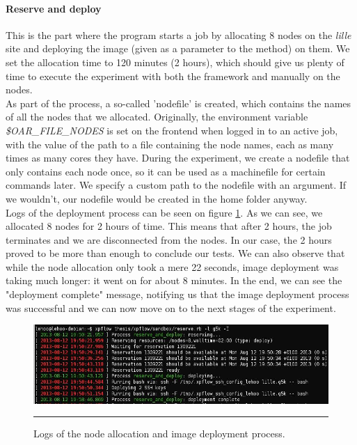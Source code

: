 \paragraph{Reserve and deploy}
This is the part where the program starts a job by allocating 8 nodes
on the \emph{lille} site and deploying the image (given as a parameter
to the method) on them. We set the allocation time to 120 minutes (2
hours), which should give us plenty of time to execute the experiment
with both the framework and manually on the nodes.\\[0.3cm]
As part of the process, a so-called 'nodefile' is created, which
contains the names of all the nodes that we allocated. Originally, the
environment variable \emph{\$OAR\_FILE\_NODES} is set on the frontend
when logged in to an active job, with the value of the path to a file
containing the node names, each as many times as many cores they
have. During the experiment, we create a nodefile that only contains
each node once, so it can be used as a machinefile for certain
commands later. We specify a custom path to the nodefile with an
argument. If we wouldn't, our nodefile would be created in the home
folder anyway.\\[0.3cm]
Logs of the deployment process can be seen on
figure \ref{fig:fex_deployment}. As we can see, we allocated 8 nodes
for 2 hours of time. This means that after 2 hours, the job terminates
and we are disconnected from the nodes. In our case, the 2 hours
proved to be more than enough to conclude our tests. We can also
observe that while the node allocation only took a mere 22 seconds,
image deployment was taking much longer: it went on for about 8
minutes. In the end, we can see the "deployment complete" message,
notifying us that the image deployment process was successful and we
can now move on to the next stages of the experiment.

\begin{figure}[htbp]
  \centering
    \includegraphics[scale=0.6]{./Figures/fex_deployment.jpg}
    \rule{35em}{0.5pt}
  \caption[Allocation and deployment]{Logs of the node allocation and
    image deployment process.}
  \label{fig:fex_deployment}
\end{figure}

